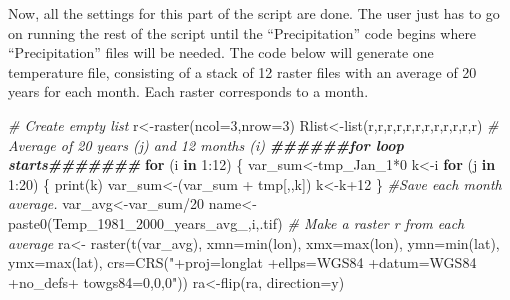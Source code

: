 \documentclass[
  10pt,
  b5paper,
]{book}
\newenvironment{Shaded}{\begin{snugshade}}{\end{snugshade}}
\newcommand{\AttributeTok}[1]{\textcolor[rgb]{0.77,0.63,0.00}{#1}}
\newcommand{\CommentTok}[1]{\textcolor[rgb]{0.56,0.35,0.01}{\textit{#1}}}
\newcommand{\ControlFlowTok}[1]{\textcolor[rgb]{0.13,0.29,0.53}{\textbf{#1}}}
\newcommand{\DecValTok}[1]{\textcolor[rgb]{0.00,0.00,0.81}{#1}}
\newcommand{\DocumentationTok}[1]{\textcolor[rgb]{0.56,0.35,0.01}{\textbf{\textit{#1}}}}
\newcommand{\FunctionTok}[1]{\textcolor[rgb]{0.00,0.00,0.00}{#1}}
\newcommand{\NormalTok}[1]{#1}
\newcommand{\OtherTok}[1]{\textcolor[rgb]{0.56,0.35,0.01}{#1}}
\newcommand{\SpecialCharTok}[1]{\textcolor[rgb]{0.00,0.00,0.00}{#1}}
\newcommand{\StringTok}[1]{\textcolor[rgb]{0.31,0.60,0.02}{#1}}
\begin{document}
Now, all the settings for this part of the script are done. The user just has to go on running the rest of the script until the ``Precipitation'' code begins where ``Precipitation'' files will be needed.
The code below will generate one temperature file, consisting of a stack of 12 raster files with an average of 20 years for each month. Each raster corresponds to a month.

\begin{Shaded}
\begin{Highlighting}[]
\CommentTok{\# Create empty list}
\NormalTok{r}\OtherTok{\textless{}{-}}\FunctionTok{raster}\NormalTok{(}\AttributeTok{ncol=}\DecValTok{3}\NormalTok{,}\AttributeTok{nrow=}\DecValTok{3}\NormalTok{)}
\NormalTok{Rlist}\OtherTok{\textless{}{-}}\FunctionTok{list}\NormalTok{(r,r,r,r,r,r,r,r,r,r,r,r)}
 \CommentTok{\# Average of 20 years (j)  and 12 months (i) }
\DocumentationTok{\#\#\#\#\#\#for loop starts\#\#\#\#\#\#\#}
 \ControlFlowTok{for}\NormalTok{ (i }\ControlFlowTok{in} \DecValTok{1}\SpecialCharTok{:}\DecValTok{12}\NormalTok{) \{ }
\NormalTok{var\_sum}\OtherTok{\textless{}{-}}\NormalTok{tmp\_Jan\_1}\SpecialCharTok{*}\DecValTok{0}
\NormalTok{k}\OtherTok{\textless{}{-}}\NormalTok{i}
 \ControlFlowTok{for}\NormalTok{ (j }\ControlFlowTok{in} \DecValTok{1}\SpecialCharTok{:}\DecValTok{20}\NormalTok{) \{}
\FunctionTok{print}\NormalTok{(k)}
\NormalTok{var\_sum}\OtherTok{\textless{}{-}}\NormalTok{(var\_sum }\SpecialCharTok{+}\NormalTok{ tmp[,,k])}
\NormalTok{ k}\OtherTok{\textless{}{-}}\NormalTok{k}\SpecialCharTok{+}\DecValTok{12}
\NormalTok{ \}}
\CommentTok{\#Save each month average. }
\NormalTok{ var\_avg}\OtherTok{\textless{}{-}}\NormalTok{var\_sum}\SpecialCharTok{/}\DecValTok{20}
\NormalTok{name}\OtherTok{\textless{}{-}}\FunctionTok{paste0}\NormalTok{(}\StringTok{\textquotesingle{}Temp\_1981\_2000\_years\_avg\_\textquotesingle{}}\NormalTok{,i,}\StringTok{\textquotesingle{}.tif\textquotesingle{}}\NormalTok{)}
 \CommentTok{\# Make a raster r from each average}
\NormalTok{ra}\OtherTok{\textless{}{-}} \FunctionTok{raster}\NormalTok{(}\FunctionTok{t}\NormalTok{(var\_avg), }\AttributeTok{xmn=}\FunctionTok{min}\NormalTok{(lon), }\AttributeTok{xmx=}\FunctionTok{max}\NormalTok{(lon), }\AttributeTok{ymn=}\FunctionTok{min}\NormalTok{(lat), }\AttributeTok{ymx=}\FunctionTok{max}\NormalTok{(lat), }\AttributeTok{crs=}\FunctionTok{CRS}\NormalTok{(}\StringTok{"+proj=longlat +ellps=WGS84 +datum=WGS84 +no\_defs+ towgs84=0,0,0"}\NormalTok{))}
\NormalTok{ra}\OtherTok{\textless{}{-}}\FunctionTok{flip}\NormalTok{(ra, }\AttributeTok{direction=}\StringTok{\textquotesingle{}y\textquotesingle{}}\NormalTok{)}

\end{Highlighting}
\end{Shaded}
\end{document}
